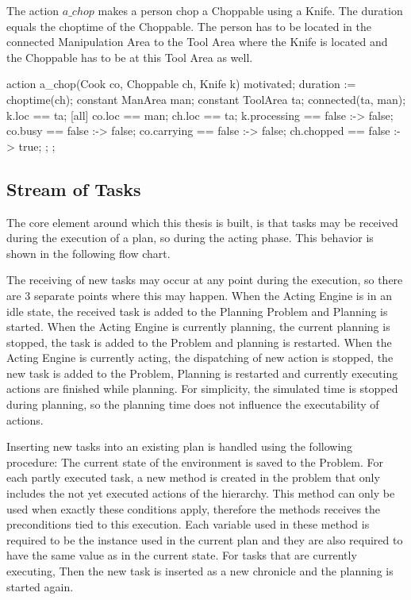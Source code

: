 The action $a\_chop$ makes a person chop a Choppable using a Knife.
The duration equals the choptime of the Choppable.
The person has to be located in the connected Manipulation Area to the Tool Area where the Knife is located and the Choppable has to be at this Tool Area as well.

\begin{anmlcode}
action a_chop(Cook co, Choppable ch, Knife k) {
  motivated;
  duration := choptime(ch);
  constant ManArea man;
  constant ToolArea ta;
  connected(ta, man);
  k.loc == ta;
  [all] {
    co.loc == man;
    ch.loc == ta;
    k.processing == false :-> false;
    co.busy == false :-> false;
    co.carrying == false :-> false;
    ch.chopped == false :-> true;
  };
};
\end{anmlcode}


\subsection{Stream of Tasks}

The core element around which this thesis is built, is that tasks may be received during the execution of a plan, so during the acting phase.
This behavior is shown in the following flow chart.


The receiving of new tasks may occur at any point during the execution, so there are 3 separate points where this may happen.
When the Acting Engine is in an idle state, the received task is added to the Planning Problem and Planning is started.
When the Acting Engine is currently planning, the current planning is stopped, the task is added to the Problem and planning is restarted.
When the Acting Engine is currently acting, the dispatching of new action is stopped, the new task is added to the Problem, Planning is restarted and currently executing actions are finished while planning.
For simplicity, the simulated time is stopped during planning, so the planning time does not influence the executability of actions.

Inserting new tasks into an existing plan is handled using the following procedure:
The current state of the environment is saved to the Problem.
For each partly executed task, a new method is created in the problem that only includes the not yet executed actions of the hierarchy.
This method can only be used when exactly these conditions apply, therefore the methods receives the preconditions tied to this execution.
Each variable used in these method is required to be the instance used in the current plan and they are also required to have the same value as in the current state.
For tasks that are currently executing, 
Then the new task is inserted as a new chronicle and the planning is started again.


